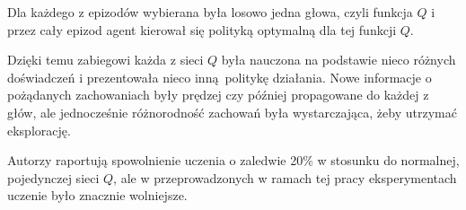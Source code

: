 Dla każdego z epizodów wybierana była losowo jedna głowa, czyli funkcja $Q$ i przez cały epizod agent kierował się polityką optymalną dla tej funkcji $Q$.

Dzięki temu zabiegowi każda z sieci $Q$ była nauczona na podstawie nieco różnych doświadczeń i prezentowała nieco inną politykę działania. Nowe informacje o pożądanych zachowaniach były prędzej czy później propagowane do każdej z głów, ale jednocześnie różnorodność zachowań była wystarczająca, żeby utrzymać eksplorację.

Autorzy raportują spowolnienie uczenia o zaledwie 20\% w stosunku do normalnej, pojedynczej sieci $Q$, ale w przeprowadzonych w ramach tej pracy eksperymentach uczenie było znacznie wolniejsze.

